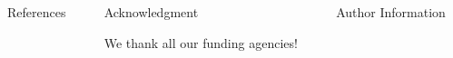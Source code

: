 \documentclass[t]{beamer}
\begin{document}
\vfill
\begin{columns}[t, onlytextwidth]%
  \begin{column}{0.42\textwidth}%
    \begin{block}[equal height group=bottom]{\normalsize References}
      \footnotesize%
      \printbibliography%
    \end{block}
  \end{column}%
  \begin{column}{0.42\textwidth}%
    \begin{block}[equal height group=bottom]{\normalsize Acknowledgment}
      \begin{multicols}{2}%
        \footnotesize
        We thank all our funding agencies!
      \end{multicols}%
    \end{block}
  \end{column}%
  \begin{column}{0.16\textwidth}%
    \footnotesize
    \begin{block}[equal height group=bottom]{\normalsize Author Information}
    \end{block}
  \end{column}%
\end{columns}%
\end{document}
